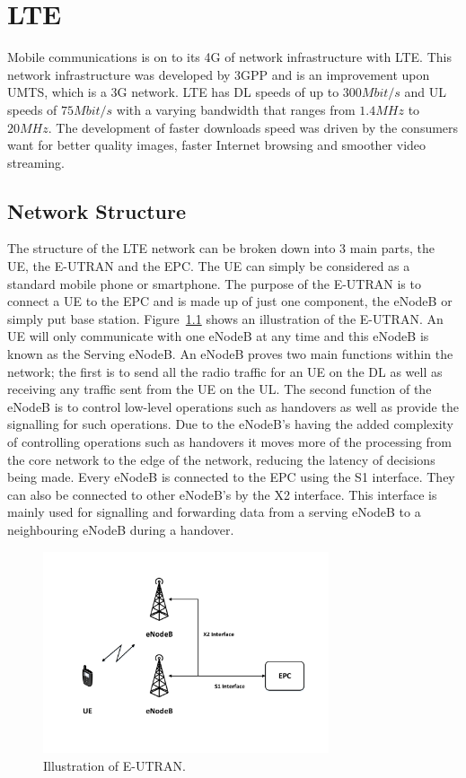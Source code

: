 \chapter{LTE}\label{lte}
Mobile communications is on to its \ac{4G} of network infrastructure with \ac{LTE}. This network infrastructure was developed by 3GPP and is an improvement upon \ac{UMTS}, which is a \ac{3G} network. \ac{LTE} has \ac{DL} speeds of up to $300 Mbit/s$ and \ac{UL} speeds of $75 Mbit/s$ with a varying bandwidth that ranges from $1.4 MHz$ to $20 MHz$. The development of faster downloads speed was driven by the consumers want for better quality images, faster Internet browsing and smoother video streaming.~\cite{cox2012introduction}

\section{Network Structure}\label{network structure}
The structure of the LTE network can be broken down into 3 main parts, the \ac{UE}, the \ac{E-UTRAN} and the \ac{EPC}. The UE can simply be considered as a standard mobile phone or smartphone. The purpose of the E-UTRAN is to connect a UE to the EPC and is made up of just one component, the \ac{eNodeB} or simply put base station. Figure~\ref{fig:eutran} shows an illustration of the E-UTRAN. An UE will only communicate with one eNodeB at any time and this eNodeB is known as the Serving eNodeB. An eNodeB proves two main functions within the network; the first is to send all the radio traffic for an UE on the DL as well as receiving any traffic sent from the UE on the UL. The second function of the eNodeB is to control low-level operations such as handovers as well as provide the signalling for such operations. Due to the eNodeB's having the added complexity of controlling operations such as handovers it moves more of the processing from the core network to the edge of the network, reducing the latency of decisions being made. Every eNodeB is connected to the EPC using the S1 interface. They can also be connected to other eNodeB's by the X2 interface. This interface is mainly used for signalling and forwarding data from a serving eNodeB to a neighbouring eNodeB during a handover.

\begin{figure}[H]
  \begin{center}
    	  \includegraphics[width=0.75\textwidth]{figures/lte/eutran.pdf}
    \end{center}
    \caption{Illustration of E-UTRAN.}
    \label{fig:eutran}
\end{figure}

